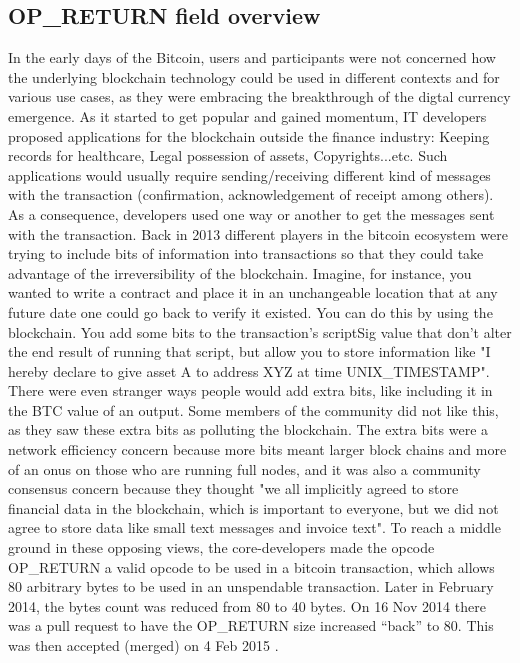\subsection{OP\_RETURN field overview\cite{bit}}
In the early days of the Bitcoin, users and participants were not concerned how the underlying blockchain technology could be used in different contexts and for various use cases, as they were embracing the breakthrough of the digtal currency emergence. As it started to get popular and gained momentum, IT developers proposed applications for the blockchain outside the finance industry: Keeping records for healthcare, Legal possession of assets, Copyrights...etc. Such applications would usually require sending/receiving different kind of messages with the transaction (confirmation, acknowledgement of receipt among others). As a consequence, developers used one way or another to get the messages sent with the transaction. Back in 2013 different players in the bitcoin ecosystem were trying to include bits of information into transactions so that they could take advantage of the irreversibility of the blockchain. Imagine, for instance, you wanted to write a contract and place it in an unchangeable location that at any future date one could go back to verify it existed. You can do this by using the blockchain. You add some bits to the transaction's scriptSig value that don't alter the end result of running that script, but allow you to store information like "I hereby declare to give asset A to address XYZ at time UNIX\_TIMESTAMP". There were even stranger ways people would add extra bits, like including it in the BTC value of an output. Some members of the community did not like this, as they saw these extra bits as polluting the blockchain. The extra bits were a network efficiency concern because more bits meant larger block chains and more of an onus on those who are running full nodes, and it was also a community consensus concern because they thought "we all implicitly agreed to store financial data in the blockchain, which is important to everyone, but we did not agree to store data like small text messages and invoice text". To reach a middle ground in these opposing views, the core-developers made the opcode OP\_RETURN a valid opcode to be used in a bitcoin transaction, which allows 80 arbitrary bytes to be used in an unspendable transaction. Later in February 2014, the bytes count was reduced from 80 to 40 bytes. On 16 Nov 2014 there was a pull request to have the OP\_RETURN size increased “back” to 80. This was then accepted (merged) on 4 Feb 2015 \cite{bit2}.\\
